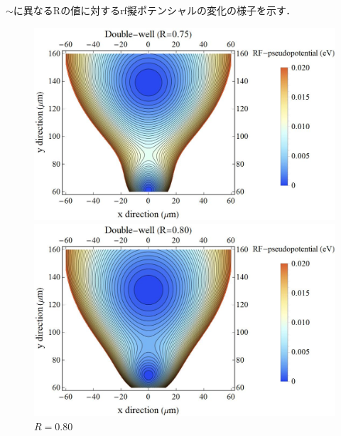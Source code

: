 $\sim$に異なるRの値に対するrf擬ポテンシャルの変化の様子を示す．
\begin{figure}[h]
	\begin{minipage}{0.48\linewidth}
		\begin{center}
			\includegraphics[width = 0.9\columnwidth]{./simulation/figure/rf_pseudopotential_R=075.jpg}
			\caption{$R=0.75$}
			\label{fig:R075}
		\end{center}
	\end{minipage}
	\begin{minipage}{0.48\linewidth}
			\begin{center}
				\includegraphics[width = 0.9\columnwidth]{./simulation/figure/rf_pseudopotential_R=080.jpg}
				\caption{$R=0.80$}
				\label{fig:R080}
			\end{center}
		\end{minipage}
\end{figure}
